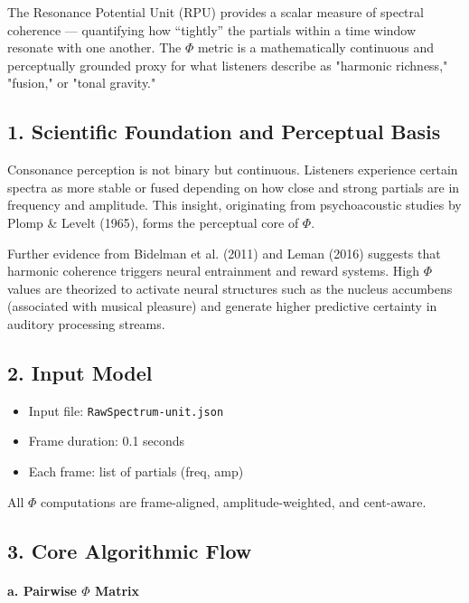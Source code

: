 The Resonance Potential Unit (RPU) provides a scalar measure of spectral coherence — quantifying how “tightly” the partials within a time window resonate with one another. The $\Phi$ metric is a mathematically continuous and perceptually grounded proxy for what listeners describe as "harmonic richness," "fusion," or "tonal gravity."

\subsection*{1. Scientific Foundation and Perceptual Basis}

Consonance perception is not binary but continuous. Listeners experience certain spectra as more stable or fused depending on how close and strong partials are in frequency and amplitude. This insight, originating from psychoacoustic studies by Plomp \& Levelt (1965), forms the perceptual core of $\Phi$.

Further evidence from Bidelman et al. (2011) and Leman (2016) suggests that harmonic coherence triggers neural entrainment and reward systems. High $\Phi$ values are theorized to activate neural structures such as the nucleus accumbens (associated with musical pleasure) and generate higher predictive certainty in auditory processing streams.

\subsection*{2. Input Model}

\begin{itemize}
    \item Input file: \texttt{RawSpectrum-unit.json}
    \item Frame duration: 0.1 seconds
    \item Each frame: list of partials (freq, amp)
\end{itemize}

All $\Phi$ computations are frame-aligned, amplitude-weighted, and cent-aware.

\subsection*{3. Core Algorithmic Flow}

\paragraph{a. Pairwise $\Phi$ Matrix}

